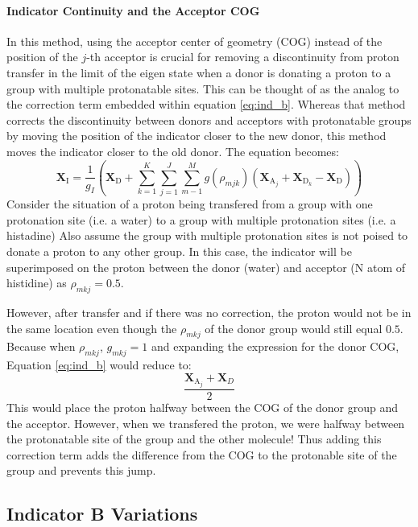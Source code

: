 \documentclass{article}
\newcommand{\mb}[1]{\mathbf{#1}}
\newcommand{\mr}[1]{\mathrm{#1}}
\begin{document}
\paragraph{Indicator Continuity and the Acceptor COG}
In this method, using the acceptor center of geometry (COG) instead of the position of the $j$-th acceptor is crucial for removing a discontinuity from proton transfer in the limit of the eigen state when a donor is donating a proton to a group with multiple protonatable sites.
This can be thought of as the analog to the correction term embedded within equation \ref{eq:ind_b}.
Whereas that method corrects the discontinuity between donors and acceptors with protonatable groups by moving the position of the indicator closer to the new donor, this method moves the indicator closer to the old donor.
The equation becomes:
\begin{equation}\label{eq:ind_b_with_correction}
\mathbf{X}_\mr{I} = \frac{1}{g_I} \left( \mathbf{X}_\mr{D} + \sum^K_{k=1} \sum^J_{j=1}   \sum^M_{m-1} g(\rho_{mjk}) \left(\mathbf{X}_{\mr{A}_j} + \mathbf{X}_{\mr{D}_k} - \mathbf{X}_\mr{D}  \right) \right) 
\end{equation}
Consider the situation of a proton being transfered from a group with one protonation site (i.e. a water) to a group with multiple protonation sites (i.e. a histadine)
Also assume the group with multiple protonation sites is not poised to donate a proton to any other group.
In this case, the indicator will be superimposed on the proton between the donor (water) and acceptor (N atom of histidine) as $\rho_{mkj} = 0.5$.

However, after transfer and if there was no correction, the proton would not be in the same location even though the $\rho_{mkj}$ of the donor group would still equal $0.5$.
Because when $\rho_{mkj}$, $g_{mkj} = 1$ and expanding the expression for the donor COG, Equation \ref{eq:ind_b} would reduce to:
\begin{equation}
\frac{\mb{X}_{\mr{A}_j} + \mb{X}_D}{2}
\end{equation}
This would place the proton halfway between the COG of the donor group and the acceptor.
However, when we transfered the proton, we were halfway between the protonatable site of the group and the other molecule!
Thus adding this correction term adds the difference from the COG to the protonable site of the group and prevents this jump.

\subsection{Indicator B Variations}
\end{document}
